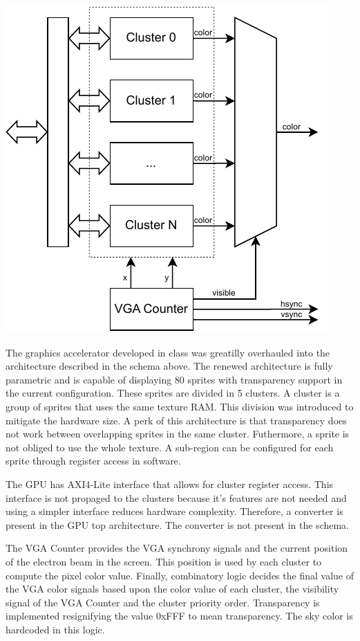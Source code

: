 \documentclass[12pt,a4paper]{article}
\begin{document}
\begin{center}
\includegraphics{schema1.pdf}
\label{fig:schema1}
\end{center} 

The graphics accelerator developed in class was greatilly overhauled into the
architecture described in the schema above. The renewed architecture is fully
parametric and is capable of displaying 80 sprites with transparency support 
in the current configuration. These sprites are divided in 5 clusters. 
A cluster is a group of sprites that uses the same texture RAM. This division
was introduced to mitigate the hardware size. A perk of this architecture is
that transparency does not work between overlapping sprites in the same cluster.
Futhermore, a sprite is not obliged to use the whole texture. A sub-region can
be configured for each sprite through register access in software.

The GPU has AXI4-Lite interface that allows for cluster register access. This
interface is not propaged to the clusters because it's features are not needed
and using a simpler interface reduces hardware complexity. Therefore, a 
converter is present in the GPU top architecture. The converter is not present
in the schema.

The VGA Counter provides the VGA synchrony signals and the current position of
the electron beam in the screen. This position is used by each cluster to
compute the pixel color value. Finally, combinatory logic decides the final
value of the VGA color signals based upon the color value of each cluster,
the visibility signal of the VGA Counter and the cluster priority order. 
Transparency is implemented resignifying the value 0xFFF to mean transparency.
The sky color is hardcoded in this logic.
\end{document}
